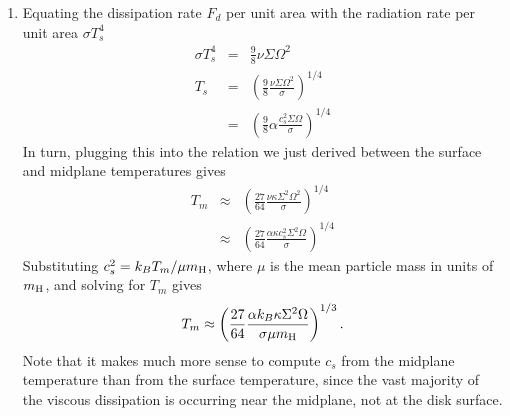 \begin{enumerate}
\begin{enumerate}
\item Equating the dissipation rate $F_d$ per unit area with the radiation rate per unit area $\sigma T_s^4$ 
\begin{eqnarray*}
\sigma T_s ^4 & = &\frac{9}{8} \nu \Sigma \Omega^2\\
T_s & = & \left(\frac{9}{8}\frac{\nu\Sigma\Omega^2}{\sigma}\right)^{1/4} \\
& = & \left(\frac{9}{8} \alpha \frac{c_s^2 \Sigma \Omega}{\sigma}\right)^{1/4}
\end{eqnarray*}
In turn, plugging this into the relation we just derived between the surface and midplane temperatures gives
\begin{eqnarray*}
T_m & \approx & \left(\frac{27}{64} \frac{\nu \kappa \Sigma^2 \Omega^2}{\sigma}\right)^{1/4} \\
& \approx & \left(\frac{27}{64} \frac{\alpha \kappa c_s^2 \Sigma^2 \Omega}{\sigma}\right)^{1/4}
\end{eqnarray*}
Substituting $c_s^2 = k_B T_m / \mu m_{\rm H}$, where $\mu$ is the mean particle mass in units of $m_{\rm H}$, and solving for $T_m$ gives
\begin{displaymath}
T_m \approx
\left(\frac{27}{64} \frac{\alpha k_B \kappa \Sigma^2 \Omega}{\sigma \mu m_{\rm H}}\right)^{1/3}.
\end{displaymath}
Note that it makes much more sense to compute $c_s$ from the midplane temperature than from the surface temperature, since the vast majority of the viscous dissipation is occurring near the midplane, not at the disk surface.\\


\end{enumerate}
\end{enumerate}
